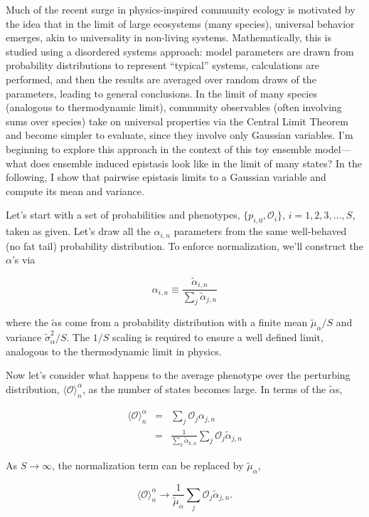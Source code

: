 \documentclass[12pt]{article}
\def\be{\begin{equation}}
\def\ee{\end{equation}}
\def\bea{\begin{eqnarray}}
\def\eea{\end{eqnarray}}
\def\O{\mathcal{O}}
\begin{document}
Much of the recent surge in physics-inspired community ecology is motivated by the idea that in the limit of large ecosystems (many species), universal behavior emerges, akin to universality in non-living systems.  Mathematically, this is studied using a disordered systems approach: model parameters are drawn from probability distributions to represent ``typical'' systems, calculations are performed, and then the results are averaged over random draws of the parameters, leading to general conclusions.  In the limit of many species (analogous to thermodynamic limit), community observables (often involving sums over species) take on universal properties via the Central Limit Theorem and become simpler to evaluate, since they involve only Gaussian variables.  I'm beginning to explore this approach in the context of this toy ensemble model---what does ensemble induced epistasis look like in the limit of many states?  In the following, I show that pairwise epistasis limits to a Gaussian variable and compute its mean and variance.

Let's start with a set of probabilities and phenotypes, $\{p_{i,0},\O_{i}\}$, $i = 1,2,3,...,S$, taken as given.  Let's draw all the $\alpha_{i,n}$ parameters from the same well-behaved (no fat tail) probability distribution.  To enforce normalization, we'll construct the $\alpha$'s via

\be
\alpha_{i,n} \equiv \frac{\tilde{\alpha}_{i,n}}{\sum_j \tilde{\alpha}_{j,n}}
\ee

\noindent where the $\tilde{\alpha}$s come from a probability distribution with a finite mean $\tilde{\mu}_{\alpha}/S$ and variance $\tilde{\sigma}^2_{\alpha}/S$.  The $1/S$ scaling is required to ensure a well defined limit, analogous to the thermodynamic limit in physics. 

Now let's consider what happens to the average phenotype over the perturbing distribution,  $\langle \O \rangle^{\alpha}_n$,  as the number of states becomes large.  In terms of the $\tilde{\alpha}$s,

\bea
\langle \O \rangle^{\alpha}_n&=& \sum_j \O_j \alpha_{j,n} \nonumber\\
&=& \frac{1}{\sum_k \tilde{\alpha}_{k,n}} \sum_j \O_j \tilde{\alpha}_{j,n}
\eea

\noindent As $S\to\infty$, the normalization term can be replaced by $\tilde{\mu}_{\alpha}$,

\be
\langle \O \rangle^{\alpha}_n \to  \frac{1}{\tilde{\mu}_{\alpha}}\sum_j \O_j \tilde{\alpha}_{j,n}.
\ee
\end{document}
